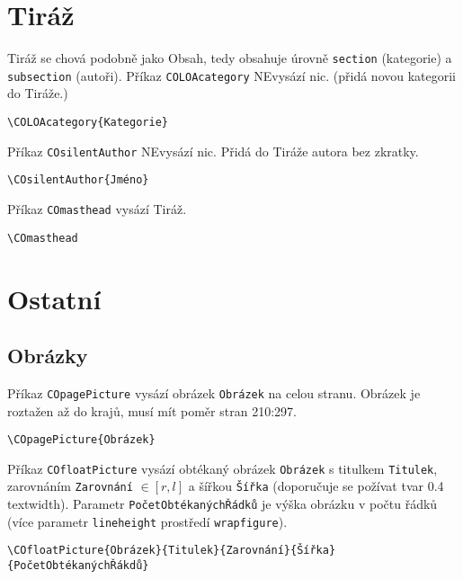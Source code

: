 \documentclass{article}
\begin{document}
\section{Tiráž}%
Tiráž se chová podobně jako Obsah, tedy obsahuje úrovně \texttt{section} (kategorie) a \texttt{subsection} (autoři).
Příkaz \texttt{COLOAcategory} NEvysází nic. (přidá novou kategorii do Tiráže.)
\begin{verbatim}
\COLOAcategory{Kategorie}
\end{verbatim}
Příkaz \texttt{COsilentAuthor} NEvysází nic. Přidá do Tiráže autora bez zkratky.
\begin{verbatim}
\COsilentAuthor{Jméno}
\end{verbatim}
Příkaz \texttt{COmasthead} vysází Tiráž.
\begin{verbatim}
\COmasthead
\end{verbatim}
%
\section{Ostatní}%
\subsection{Obrázky}
Příkaz \texttt{COpagePicture} vysází obrázek \texttt{Obrázek} na celou stranu. Obrázek je roztažen až do krajů, musí mít poměr stran 210:297.
\begin{verbatim}
\COpagePicture{Obrázek}
\end{verbatim}
Příkaz \texttt{COfloatPicture} vysází obtékaný obrázek \texttt{Obrázek} s titulkem \texttt{Titulek}, zarovnáním \texttt{Zarovnání} $ \in \left[r,l\right] $ a šířkou \texttt{Šířka} (doporučuje se požívat tvar 0.4\\textwidth). Parametr \texttt{PočetObtékanýchŘádků} je výška obrázku v počtu řádků (více parametr \texttt{lineheight} prostředí \texttt{wrapfigure}).
\begin{verbatim}
\COfloatPicture{Obrázek}{Titulek}{Zarovnání}{Šířka}{PočetObtékanýchŘákdů}
\end{verbatim}
%
\end{document}
